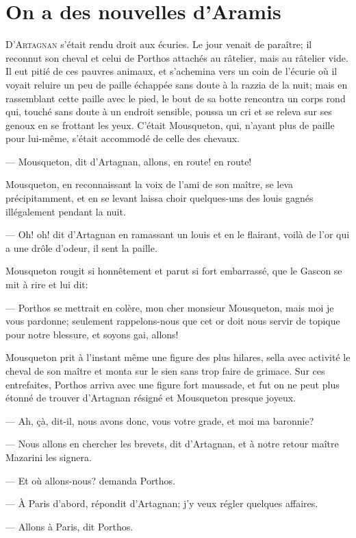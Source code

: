 \chapter{On a des nouvelles d'Aramis}

\lettrine{D}{'Artagnan} s'était rendu droit aux écuries. Le jour venait de paraître; il reconnut son cheval et celui de Porthos attachés au râtelier, mais au râtelier vide. Il eut pitié de ces pauvres animaux, et s'achemina vers un coin de l'écurie où il voyait reluire un peu de paille échappée sans doute à la razzia de la nuit; mais en rassemblant cette paille avec le pied, le bout de sa botte rencontra un corps rond qui, touché sans doute à un endroit sensible, poussa un cri et se releva sur ses genoux en se frottant les yeux. C'était Mousqueton, qui, n'ayant plus de paille pour lui-même, s'était accommodé de celle des chevaux.

— Mousqueton, dit d'Artagnan, allons, en route! en route!

Mousqueton, en reconnaissant la voix de l'ami de son maître, se leva précipitamment, et en se levant laissa choir quelques-uns des louis gagnés illégalement pendant la nuit.

— Oh! oh! dit d'Artagnan en ramassant un louis et en le flairant, voilà de l'or qui a une drôle d'odeur, il sent la paille.

Mousqueton rougit si honnêtement et parut si fort embarrassé, que le Gascon se mit à rire et lui dit:

— Porthos se mettrait en colère, mon cher monsieur Mousqueton, mais moi je vous pardonne; seulement rappelons-nous que cet or doit nous servir de topique pour notre blessure, et soyons gai, allons!

Mousqueton prit à l'instant même une figure des plus hilares, sella avec activité le cheval de son maître et monta sur le sien sans trop faire de grimace. Sur ces entrefaites, Porthos arriva avec une figure fort maussade, et fut on ne peut plus étonné de trouver d'Artagnan résigné et Mousqueton presque joyeux.

— Ah, çà, dit-il, nous avons donc, vous votre grade, et moi ma baronnie?

— Nous allons en chercher les brevets, dit d'Artagnan, et à notre retour maître Mazarini les signera.

— Et où allons-nous? demanda Porthos.

— À Paris d'abord, répondit d'Artagnan; j'y veux régler quelques affaires.

— Allons à Paris, dit Porthos.

